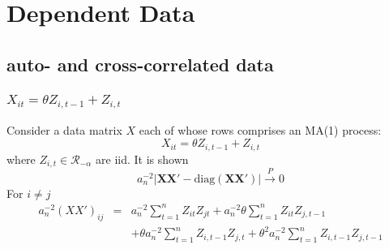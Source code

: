 \documentclass{beamer}
\renewcommand{\P}{
\mathbb P
}
\begin{document}
  

\section[dependent data]{Dependent Data}
\subsection{auto- and cross-correlated data}
\begin{frame}
\frametitle{$X_{it} = \theta Z_{i, t-1} + Z_{i, t}$}
Consider a data matrix $X$ each of whose rows comprises an MA(1) process:
$$
X_{it} = \theta Z_{i, t-1} + Z_{i, t}
$$
where $Z_{i,t} \in \mathcal R_{-\alpha}$ are iid. It is shown
$$
a_n^{-2} |\mathbf{XX'} - \text{diag}(\mathbf{XX'})| \overset{P}{\to} 0
$$
For $i \neq j$
\begin{eqnarray*}
  a_n^{-2}(XX')_{ij} &=& a_n^{-2} \sum_{t=1}^n Z_{it} Z_{jt} +
  a_n^{-2} \theta \sum_{t=1}^n Z_{it} Z_{j,t-1} \\
  && +\theta a_n^{-2} \sum_{t=1}^n Z_{i, t-1}
  Z_{j,t} + \theta^2 a_n^{-2} \sum_{t=1}^n Z_{i,t-1} Z_{j,t-1}
\end{eqnarray*}

\end{frame}
\end{document}
